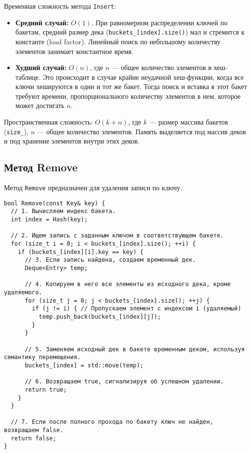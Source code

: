 \documentclass[a4paper,12pt]{article}
\begin{document}
Временная сложность метода \texttt{Insert}:
\begin{itemize}
    \item \textbf{Средний случай:} $O(1)$. При равномерном распределении ключей по бакетам, средний размер дека (\texttt{buckets\_[index].size()}) мал и стремится к константе (load factor). Линейный поиск по небольшому количеству элементов занимает константное время.
    \item \textbf{Худший случай:} $O(n)$, где $n$ --- общее количество элементов в хеш-таблице. Это происходит в случае крайне неудачной хеш-функции, когда все ключи хешируются в один и тот же бакет. Тогда поиск и вставка в этот бакет требуют времени, пропорционального количеству элементов в нем, которое может достигать $n$.
\end{itemize}

Пространственная сложность: $O(k + n)$, где $k$ --- размер массива бакетов (\texttt{size\_}), $n$ --- общее количество элементов. Память выделяется под массив деков и под хранение элементов внутри этих деков.

\subsection{Метод Remove}

Метод \texttt{Remove} предназначен для удаления записи по ключу.

\begin{lstlisting}[style=cpp]
bool Remove(const Key& key) {
  // 1. Вычисляем индекс бакета.
  int index = Hash(key);
  
  // 2. Ищем запись с заданным ключом в соответствующем бакете.
  for (size_t i = 0; i < buckets_[index].size(); ++i) {
    if (buckets_[index][i].key == key) {
      // 3. Если запись найдена, создаем временный дек.
      Deque<Entry> temp;
      
      // 4. Копируем в него все элементы из исходного дека, кроме удаляемого.
      for (size_t j = 0; j < buckets_[index].size(); ++j) {
        if (j != i) { // Пропускаем элемент с индексом i (удаляемый)
          temp.push_back(buckets_[index][j]);
        }
      }
      
      // 5. Заменяем исходный дек в бакете временным деком, используя семантику перемещения.
      buckets_[index] = std::move(temp);
      
      // 6. Возвращаем true, сигнализируя об успешном удалении.
      return true;
    }
  }
  
  // 7. Если после полного прохода по бакету ключ не найден, возвращаем false.
  return false;
}
\end{lstlisting}
\end{document}
